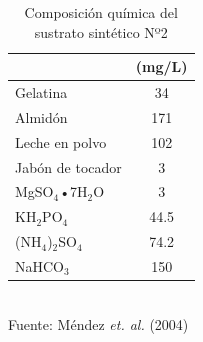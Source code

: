 	\begin{table}
	\caption{Composición química del sustrato sintético Nº2}
	\label{tab:sustrato}
	\begin{center}
	\begin{scriptsize}
	\begin{tabular}{|l|c|}
		\hline
		\rowcolor{blanc}
		\multicolumn{1}{|c|}{\textbf{Compuestos}} & \textbf{(mg/L)}\\ \hline
		Gelatina & 34\\
		Almidón & 171\\
		Leche en polvo & 102\\
		Jabón de tocador & 3\\
		MgSO$_{4}$•7H$_{2}$O & 3\\
		KH$_{2}$PO$_{4}$ & 44.5\\
		(NH$_{4}$)$_{2}$SO$_{4}$ & 74.2\\
		NaHCO$_{3}$ & 150\\ \hline
	\end{tabular}
	\end{scriptsize}
	\\ \small{Fuente: Méndez \textit{et. al.} (2004)}
	\end{center}
	\end{table}
